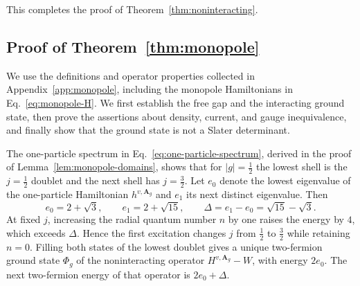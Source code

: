 \documentclass[11pt,a4paper]{article}
\theoremstyle{remark}
\theoremstyle{plain}
\newcommand{\A}{\mathbf A}
\begin{document}
This completes the proof of Theorem~\ref{thm:noninteracting}.

\subsection{Proof of Theorem~\ref{thm:monopole}}
\label{sec:monopole-proof}

We use the definitions and operator properties collected in
Appendix~\ref{app:monopole}, including the monopole Hamiltonians
in Eq.~\eqref{eq:monopole-H}. We first establish the free gap and the
interacting ground state, then prove the assertions about density,
current, and gauge inequivalence, and finally show that the ground
state is not a Slater determinant.

The one-particle spectrum in Eq.~\eqref{eq:one-particle-spectrum}, derived
in the proof of Lemma~\ref{lem:monopole-domains}, shows that for
$|g|=\tfrac12$ the lowest shell is the $j=\tfrac12$ doublet and the next
shell has $j=\tfrac32$. Let $e_0$ denote the lowest
eigenvalue of the one-particle Hamiltonian $h^{v,\A_g}$ and $e_1$
its next distinct eigenvalue. Then
\begin{equation}
 e_0=2+\sqrt3,\qquad e_1=2+\sqrt{15},\qquad
 \Delta=e_1-e_0=\sqrt{15}-\sqrt3.
 \label{eq:free-gap}
\end{equation}
At fixed $j$, increasing the radial quantum number $n$ by one raises
the energy by $4$, which exceeds $\Delta$. Hence the first excitation
changes $j$ from $\tfrac12$ to $\tfrac32$ while retaining $n=0$. Filling both states of the
lowest doublet gives a unique two-fermion ground state $\Phi_g$ of
the noninteracting operator $H^{v,\A_g}-W$, with energy $2e_0$. The
next two-fermion energy of that operator is $2e_0+\Delta$.
\end{document}
